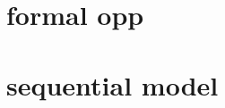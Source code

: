 \documentclass[]{article}
\begin{document}



% 

\clearpage
\section{formal opp}



\clearpage
\section{sequential model}


\end{document}
